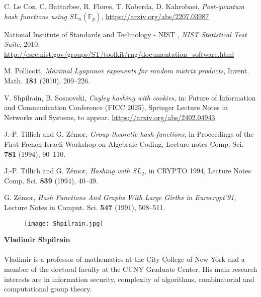 \documentclass{lmsedition}
\newcommand{\F}{\mathbb{F}}
\begin{document}
\begin{twoblock}
\begin{thebibliography}{ABC}

C. Le Coz, C. Battarbee, R. Flores, T. Koberda, D. Kahrobaei, {\it Post-quantum
hash functions using $SL_n(\F_p)$}, \url{https://arxiv.org/abs/2207.03987}

National Institute of Standards and Technology - NIST , \emph{NIST
Statistical Test Suite}, 2010. \url{http://csrc.nist.gov/groups/ST/toolkit/rng/documentation\_software.html}


M. Pollicott, {\it Maximal Lyapunov exponents for random matrix products}, Invent. Math. {\bf 181} (2010), 209--226.

V. Shpilrain, B. Sosnovski, {\it Cayley hashing with cookies}, in: Future of Information and Communication Conference (FICC 2025), Springer Lecture Notes in Networks and Systems, to appear.  \url{https://arxiv.org/abs/2402.04943}

J.-P. Tillich and G. Z\'emor,  {\it Group-theoretic hash functions},
in Proceedings of the First French-Israeli Workshop on Algebraic
Coding, Lecture notes  Comp. Sci. {\bf  781} (1994),   90--110.

J.-P. Tillich and G. Z\'emor, {\it Hashing with $SL_2$}, in CRYPTO
1994, Lecture Notes  Comp. Sci. {\bf 839} (1994), 40--49.

G. Z\'emor, {\it  Hash Functions And Graphs With Large Girths  in Eurocrypt'91}, Lecture Notes in Comput. Sci. {\bf 547} (1991), 508--511.


\end{thebibliography}


\begin{wrapfigure}{l}{32mm}
\texttt{[image: Shpilrain.jpg]}
\end{wrapfigure} 
\textbf{{\large Vladimir Shpilrain}}  \\~\\
Vladimir is a professor of mathematics at the City College of New York and a member of the doctoral faculty at the CUNY Graduate Center.  His main research interests are in information security, complexity of algorithms, combinatorial and computational group theory.


\end{twoblock}
\end{document}
